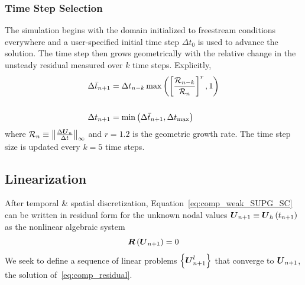 \documentclass[compress,11pt]{beamer}
\begin{document}
\frame
{
  \frametitle{\scriptsize Time Step Selection}
    \vspace{-.5em}    
  The simulation begins with the domain initialized to freestream conditions everywhere and a user-specified initial time step $\Delta t_0$ is used to advance the solution.  The time step then grows geometrically with the relative change in the unsteady residual measured over $k$ time steps.  Explicitly, 
\begin{align}
  \Delta \bar{t}_{n+1} &= \Delta t_{n-k} \max\left(\left[\frac{\mathcal{R}_{n-k}}{\mathcal{R}_{n}}\right]^r,1\right) \label{geometric_timestep_growth} \\ \vspace{1em}
                 & \nonumber \\
  \Delta t_{n+1} &= \min\left(\Delta \bar{t}_{n+1},\Delta t_{\text{max}}\right) \label{dt_limiting}
\end{align}
where $\mathcal{R}_{n} \equiv \left\|\frac{\Delta {\boldsymbol{U}}_n}{\Delta t}\right\|_{\infty}$ and $r=1.2$ is the geometric growth rate.  The time step size is updated every $k=5$ time steps.

}


\subsection{Linearization}
\frame
{
  After temporal \& spatial discretization,  Equation~\eqref{eq:comp_weak_SUPG_SC} can be written in residual form for the unknown nodal values ${\boldsymbol{U}}_{n+1}\equiv{\boldsymbol{U}}_h\left(t_{n+1}\right)$ as the nonlinear algebraic system
\begin{equation}
  \label{eq:comp_residual}  
  {\boldsymbol{R}}\left({\boldsymbol{U}}_{n+1}\right) = 0 
\end{equation}
We seek to define a sequence of linear problems $\left\{{\boldsymbol{U}}_{n+1}^l\right\}$ that converge to ${\boldsymbol{U}}_{n+1}$, the solution of~\eqref{eq:comp_residual}.
}
\end{document}
